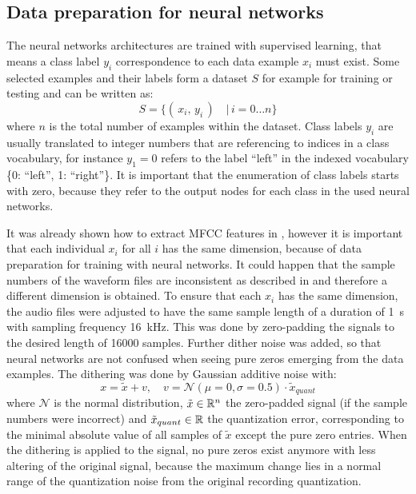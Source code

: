 
\subsection{Data preparation for neural networks}\label{sec:exp_data_prep}
The neural networks architectures are trained with supervised learning, that means a class label $y_i$ correspondence to each data example $x_i$ must exist.
Some selected examples and their labels form a dataset $S$ for example for training or testing and can be written as:
\begin{equation}\label{eq:exp_dataset}
  S = \{ (\,x_i, \, y_i\,) \quad | \, i = 0 \dots n \}
\end{equation}
where $n$ is the total number of examples within the dataset.
Class labels $y_i$ are usually translated to integer numbers that are referencing to indices in a class vocabulary, for instance $y_1 = 0$ refers to the label \enquote{left} in the indexed vocabulary \{0: \enquote{left}, 1: \enquote{right}\}.
It is important that the enumeration of class labels starts with zero, because they refer to the output nodes for each class in the used neural networks.

It was already shown how to extract MFCC features in , however it is important that each individual $x_i$ for all $i$ has the same dimension, because of data preparation for training with neural networks.
It could happen that the sample numbers of the waveform files are inconsistent as described in  and therefore a different dimension is obtained.
To ensure that each $x_i$ has the same dimension, the audio files were adjusted to have the same sample length of a duration of \SI{1}{\second} with sampling frequency \SI{16}{\kilo\hertz}.
This was done by zero-padding the signals to the desired length of 16000 samples.
Further dither noise was added, so that neural networks are not confused when seeing pure zeros emerging from the data examples.
The dithering was done by Gaussian additive noise with:
\begin{equation}\label{eq:exp_dither}
  x = \tilde{x} + v, \quad v = \mathcal{N}(\mu=0, \sigma=0.5) \cdot \tilde{x}_{quant}%
\end{equation}
where $\mathcal{N}$ is the normal distribution, $\tilde{x} \in \mathbb{R}^n$ the zero-padded signal (if the sample numbers were incorrect) and $\tilde{x}_{quant} \in \mathbb{R}$ the quantization error, corresponding to the minimal absolute value of all samples of $\tilde{x}$ except the pure zero entries.
When the dithering is applied to the signal, no pure zeros exist anymore with less altering of the original signal, because the maximum change lies in a normal range of the quantization noise from the original recording quantization.

